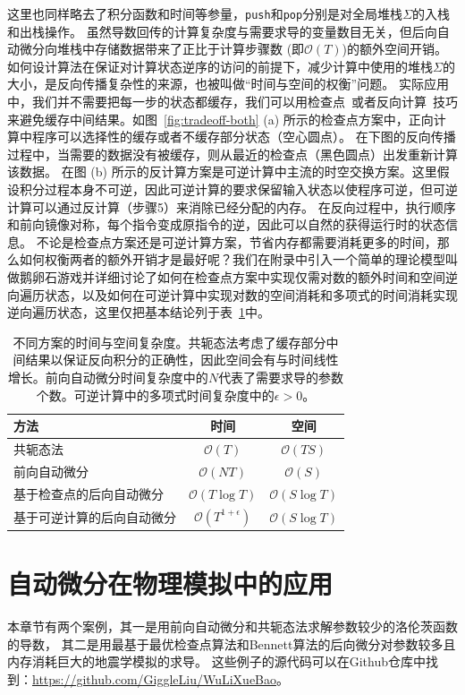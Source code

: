 \documentclass[A4,twoside,UTF8]{ctexart}
\newcommand{\bigO}{{\mathcal{O}}}
\begin{document}
这里也同样略去了积分函数和时间等参量，\texttt{push}和\texttt{pop}分别是对全局堆栈$\Sigma$的入栈和出栈操作。
虽然导数回传的计算复杂度与需要求导的变量数目无关，但后向自动微分向堆栈中存储数据带来了正比于计算步骤数 (即$\bigO(T)$)的额外空间开销。
如何设计算法在保证对计算状态逆序的访问的前提下，减少计算中使用的堆栈$\Sigma$的大小，是反向传播复杂性的来源，也被叫做“时间与空间的权衡”问题。
实际应用中，我们并不需要把每一步的状态都缓存，我们可以用检查点~\cite{Griewank1992}或者反向计算~\cite{Liu2020b}技巧来避免缓存中间结果。如图~\ref{fig:tradeoff-both} (a) 所示的检查点方案中，正向计算中程序可以选择性的缓存或者不缓存部分状态（空心圆点）。
在下图的反向传播过程中，当需要的数据没有被缓存，则从最近的检查点（黑色圆点）出发重新计算该数据。
在图 (b) 所示的反计算方案是可逆计算中主流的时空交换方案。这里假设积分过程本身不可逆，因此可逆计算的要求保留输入状态以使程序可逆，但可逆计算可以通过反计算（步骤5）来消除已经分配的内存。
在反向过程中，执行顺序和前向镜像对称，每个指令变成原指令的逆，因此可以自然的获得运行时的状态信息。
不论是检查点方案还是可逆计算方案，节省内存都需要消耗更多的时间，那么如何权衡两者的额外开销才是最好呢？我们在附录中引入一个简单的理论模型叫做鹅卵石游戏并详细讨论了如何在检查点方案中实现仅需对数的额外时间和空间逆向遍历状态，以及如何在可逆计算中实现对数的空间消耗和多项式的时间消耗实现逆向遍历状态，这里仅把基本结论列于表~\ref{tbl:complexity}中。

\begin{table}\centering
    \begin{tabularx}{0.7\textwidth}{Xcc}\toprule
        \textbf{方法} & 时间 & 空间\\
        \hline
        共轭态法                    &  $\bigO(T)$          & $\bigO(TS)$\\
        前向自动微分                 &  $\bigO(NT)$         & $\bigO(S)$  \\
        基于检查点的后向自动微分     &  $\bigO(T\log T)$    & $\bigO(S\log T)$   \\
        基于可逆计算的后向自动微分   &  $\bigO(T^{1+\epsilon})$ & $\bigO(S\log T)$ \\
        \bottomrule
    \end{tabularx}
    \caption{不同方案的时间与空间复杂度。共轭态法考虑了缓存部分中间结果以保证反向积分的正确性，因此空间会有与时间线性增长。前向自动微分时间复杂度中的$N$代表了需要求导的参数个数。可逆计算中的多项式时间复杂度中的$\epsilon > 0$。} \label{tbl:complexity}
\end{table}


\section{自动微分在物理模拟中的应用}\label{sec:applications}
本章节有两个案例，其一是用前向自动微分和共轭态法求解参数较少的洛伦茨函数的导数，
其二是用最基于最优检查点算法和Bennett算法的后向微分对参数较多且内存消耗巨大的地震学模拟的求导。
这些例子的源代码可以在Github仓库中找到：\href{https://github.com/GiggleLiu/WuLiXueBao}{https://github.com/GiggleLiu/WuLiXueBao}。
\end{document}
